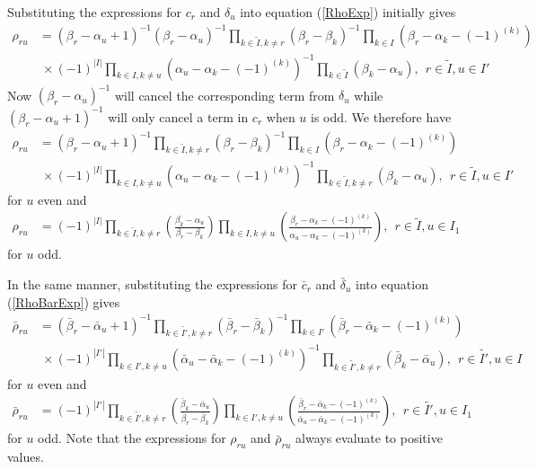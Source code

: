 \documentclass[12pt]{article}
\begin{document}
Substituting the expressions for ${c}_r$ and ${\delta}_u$ into equation 
 (\ref{RhoExp}) initially gives
\begin{align*}
{\rho}_{ru} &= ({\beta}_r-{\alpha}_u + 1)^{-1}({\beta}_r-{\alpha}_u)^{-1} \prod_{k\in \tilde{I},k\neq r} \left(\beta_r - \beta_k \right)^{-1}\prod_{k\in
I} \left(\beta_r - \alpha_k - (-1)^{(k)}\right) \\
& ~\times (-1)^{|I|} \prod_{k\in I,k\neq u} \left(\alpha_u - \alpha_k -
(-1)^{(k)}\right)^{-1}\prod_{k\in\tilde{I}} \left(\beta_k - \alpha_u \right),\ \ r\in \tilde{I},u\in I' 
\end{align*}
Now $({\beta}_r-{\alpha}_u)^{-1}$ will cancel the corresponding term from $\delta_u$ while $
({\beta}_r-{\alpha}_u + 1)^{-1}$ will only cancel a term in $c_r$ when $u$ is odd. We therefore have
\begin{align*}
{\rho}_{ru} &= ({\beta}_r-{\alpha}_u + 1)^{-1}\prod_{k\in \tilde{I},k\neq r} \left(\beta_r - \beta_k \right)^{-1}\prod_{k\in
I} \left(\beta_r - \alpha_k - (-1)^{(k)}\right) \\
& ~\times (-1)^{|I|} \prod_{k\in I,k\neq u} \left(\alpha_u - \alpha_k -
(-1)^{(k)}\right)^{-1}\prod_{k\in\tilde{I},k \neq r} \left(\beta_k - \alpha_u \right),\ \ r\in \tilde{I},u\in I' 
\end{align*}
for $u$ even and
\begin{align*}
{\rho}_{ru} &= (-1)^{|I|} \prod_{k\in \tilde{I},k\neq r} 
\left(
\frac 
{\beta_k - \alpha_u  }
{\beta_r - \beta_k }
\right)
\prod_{k\in I,k \neq u} 
\left(
\frac
{ \beta_r - \alpha_k - (-1)^{(k)} }
{\alpha_u - \alpha_k - (-1)^{(k)} }
\right)
,\ \ r\in \tilde{I},u\in I_1
\end{align*}
for $u$ odd.

In the same manner, substituting the expressions for $\bar{c}_r$ and $\bar{\delta}_u$ into equation 
 (\ref{RhoBarExp}) gives
\begin{align*}
\bar{\rho}_{ru} &= (\bar{\beta}_r-\bar{\alpha}_u + 1)^{-1}\prod_{k\in \tilde{I'},k\neq r} \left(\bar{\beta}_r - \bar{\beta}_k \right)^{-1}\prod_{k\in
I'} \left(\bar{\beta}_r - \bar{\alpha}_k - (-1)^{(k)}\right) \\
& ~\times (-1)^{|I'|} \prod_{k\in I',k\neq u} \left(\bar{\alpha}_u - \bar{\alpha}_k -
(-1)^{(k)}\right)^{-1}\prod_{k\in\tilde{I'},k \neq r} \left(\bar{\beta}_k - \bar{\alpha}_u \right),\ \ r\in \tilde{I'},u\in I 
\end{align*}
for $u$ even and
\begin{align*}
\bar{\rho}_{ru} &= (-1)^{|I'|} \prod_{k\in \tilde{I'},k\neq r} 
\left(
\frac 
{\bar{\beta}_k - \bar{\alpha}_u  }
{\bar{\beta}_r - \bar{\beta}_k }
\right)
\prod_{k\in I',k \neq u} 
\left(
\frac
{ \bar{\beta}_r - \bar{\alpha}_k - (-1)^{(k)} }
{\bar{\alpha}_u - \bar{\alpha}_k - (-1)^{(k)} }
\right)
,\ \ r\in \tilde{I'},u\in I_1
\end{align*}
for $u$ odd. Note that the expressions for $\rho_{ru}$ and $\bar{\rho}_{ru}$ always evaluate to positive values. 
\end{document}
